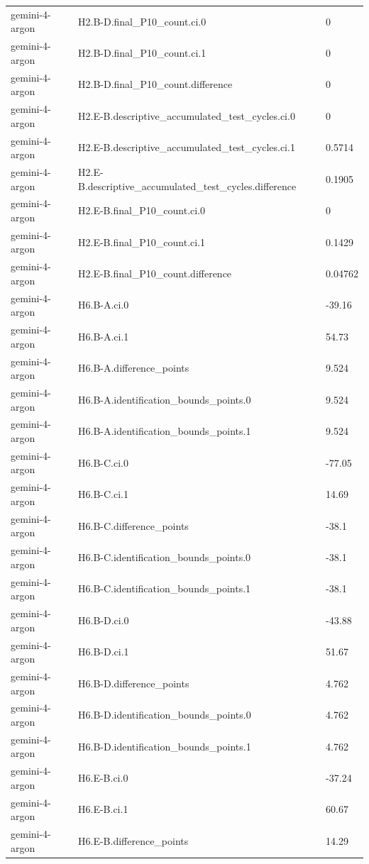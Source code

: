 \begin{tabular}{lll}
gemini-4-argon & H2.B-D.final\_P10\_count.ci.0 & 0 \\
gemini-4-argon & H2.B-D.final\_P10\_count.ci.1 & 0 \\
gemini-4-argon & H2.B-D.final\_P10\_count.difference & 0 \\
gemini-4-argon & H2.E-B.descriptive\_accumulated\_test\_cycles.ci.0 & 0 \\
gemini-4-argon & H2.E-B.descriptive\_accumulated\_test\_cycles.ci.1 & 0.5714 \\
gemini-4-argon & H2.E-B.descriptive\_accumulated\_test\_cycles.difference & 0.1905 \\
gemini-4-argon & H2.E-B.final\_P10\_count.ci.0 & 0 \\
gemini-4-argon & H2.E-B.final\_P10\_count.ci.1 & 0.1429 \\
gemini-4-argon & H2.E-B.final\_P10\_count.difference & 0.04762 \\
gemini-4-argon & H6.B-A.ci.0 & -39.16 \\
gemini-4-argon & H6.B-A.ci.1 & 54.73 \\
gemini-4-argon & H6.B-A.difference\_points & 9.524 \\
gemini-4-argon & H6.B-A.identification\_bounds\_points.0 & 9.524 \\
gemini-4-argon & H6.B-A.identification\_bounds\_points.1 & 9.524 \\
gemini-4-argon & H6.B-C.ci.0 & -77.05 \\
gemini-4-argon & H6.B-C.ci.1 & 14.69 \\
gemini-4-argon & H6.B-C.difference\_points & -38.1 \\
gemini-4-argon & H6.B-C.identification\_bounds\_points.0 & -38.1 \\
gemini-4-argon & H6.B-C.identification\_bounds\_points.1 & -38.1 \\
gemini-4-argon & H6.B-D.ci.0 & -43.88 \\
gemini-4-argon & H6.B-D.ci.1 & 51.67 \\
gemini-4-argon & H6.B-D.difference\_points & 4.762 \\
gemini-4-argon & H6.B-D.identification\_bounds\_points.0 & 4.762 \\
gemini-4-argon & H6.B-D.identification\_bounds\_points.1 & 4.762 \\
gemini-4-argon & H6.E-B.ci.0 & -37.24 \\
gemini-4-argon & H6.E-B.ci.1 & 60.67 \\
gemini-4-argon & H6.E-B.difference\_points & 14.29 \\

\end{tabular}
